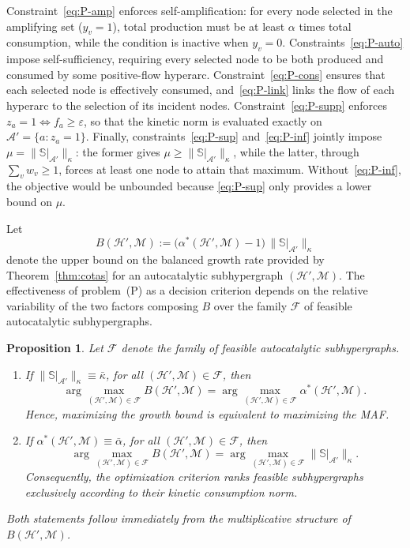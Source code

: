 \documentclass[a4paper,11pt,reqno]{amsart}
\newtheorem{proposition}[definition]{Proposition}
\begin{document}
Constraint~\eqref{eq:P-amp} enforces self-amplification: for every 
node selected in the amplifying set ($y_v=1$), total production must be at least $\alpha$ times total
consumption, while the condition is inactive when $y_v=0$.
Constraints~\eqref{eq:P-auto} impose self-sufficiency, requiring every selected
node to be both produced and consumed by some positive-flow hyperarc.
Constraint~\eqref{eq:P-cons} ensures that each selected node is effectively
consumed, and~\eqref{eq:P-link} links the flow of each hyperarc to the selection
of its incident nodes. Constraint~\eqref{eq:P-supp} enforces
$z_a=1\iff f_a\geq\varepsilon$, so that the kinetic norm is evaluated exactly on
$\mathcal A'=\{a:z_a=1\}$. Finally, constraints~\eqref{eq:P-sup}
and~\eqref{eq:P-inf} jointly impose
$\mu=\|\mathbb{S}|_{\mathcal A'}\|_{\kappa}$: the former gives
$\mu\geq\|\mathbb{S}|_{\mathcal A'}\|_{\kappa}$, while the latter,
through $\sum_v w_v\geq1$, forces at least one node to attain that maximum.
Without~\eqref{eq:P-inf}, the objective would be unbounded because
\eqref{eq:P-sup} only provides a lower bound on $\mu$.


Let
$$
B(\mathcal{H}',\mathcal{M})
:=
\bigl(\alpha^*(\mathcal{H}',\mathcal{M})-1\bigr)
\,
\|\mathbb{S}|_{\mathcal{A}'}\|_{\kappa}
$$
denote the upper bound on the balanced growth rate provided by
Theorem~\ref{thm:cotas} for an autocatalytic subhypergraph
$(\mathcal{H}',\mathcal{M})$. The effectiveness of problem~(P) as a
decision criterion depends on the relative variability of the two factors
composing $B$ over the family $\mathcal{F}$ of feasible autocatalytic
subhypergraphs.

\begin{proposition}
\label{prop:reducciones}
Let $\mathcal{F}$ denote the family of feasible autocatalytic
subhypergraphs.

\begin{enumerate}
\item[(i)]
If $
\|\mathbb{S}|_{\mathcal{A}'}\|_{\kappa}
\equiv
\bar{\kappa}$, for all $(\mathcal{H}',\mathcal{M})\in\mathcal{F}$, 
then
$$
\arg\max_{(\mathcal{H}',\mathcal{M})\in\mathcal{F}}
B(\mathcal{H}',\mathcal{M})
=
\arg\max_{(\mathcal{H}',\mathcal{M})\in\mathcal{F}}
\alpha^*(\mathcal{H}',\mathcal{M}).
$$
Hence, maximizing the growth bound is equivalent to maximizing the MAF.

\item[(ii)]
If $\alpha^*(\mathcal{H}',\mathcal{M})
\equiv
\bar{\alpha}$, for all $(\mathcal{H}',\mathcal{M})\in\mathcal{F}$, 
then
$$
\arg\max_{(\mathcal{H}',\mathcal{M})\in\mathcal{F}}
B(\mathcal{H}',\mathcal{M})
=
\arg\max_{(\mathcal{H}',\mathcal{M})\in\mathcal{F}}
\|\mathbb{S}|_{\mathcal{A}'}\|_{\kappa}.
$$
Consequently, the optimization criterion ranks feasible subhypergraphs
exclusively according to their kinetic consumption norm.
\end{enumerate}

Both statements follow immediately from the multiplicative structure of
$B(\mathcal{H}',\mathcal{M})$.
\end{proposition}
\end{document}
